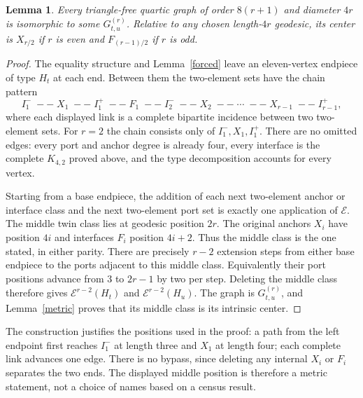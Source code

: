 \documentclass[11pt]{article}
\newtheorem{lemma}[theorem]{Lemma}
\theoremstyle{definition}\newtheorem{definition}[theorem]{Definition}
\newcommand{\E}{\mathcal E}
\begin{document}
\begin{lemma}\label{complete}
Every triangle-free quartic graph of order $8(r+1)$ and diameter
$4r$ is isomorphic to some $G_{t,u}^{(r)}$. Relative to any chosen
length-$4r$ geodesic, its center is $X_{r/2}$ if $r$ is even and
$F_{(r-1)/2}$ if $r$ is odd.
\end{lemma}
\begin{proof}
The equality structure and Lemma~\ref{forced} leave an eleven-vertex
endpiece of type $H_t$ at each end. Between them the two-element
sets have the chain pattern
\[
 I_1^-\;--\;X_1\;--\;I_1^+\;--\;F_1\;--\;
 I_2^-\;--\;X_2\;--\;\cdots\;--\;X_{r-1}\;--\;I_{r-1}^+,
\]
where each displayed link is a complete bipartite incidence between
two two-element sets. For $r=2$ the chain consists only of
$I_1^-,X_1,I_1^+$. There are no omitted edges: every port and
anchor degree is already four, every interface is the complete
$K_{4,2}$ proved above, and the type decomposition accounts for
every vertex.

Starting from a base endpiece, the addition of each next two-element
anchor or interface class and the next two-element port set is
exactly one application of $\E$. The middle twin class lies at
geodesic position $2r$. The original anchors $X_i$ have position
$4i$ and interfaces $F_i$ position $4i+2$. Thus the middle class
is the one stated, in either parity. There are precisely $r-2$
extension steps from either base endpiece to the ports adjacent
to this middle class. Equivalently their port positions advance
from $3$ to $2r-1$ by two per step. Deleting the middle class
therefore gives $\E^{r-2}(H_t)$ and $\E^{r-2}(H_u)$.
The graph is $G_{t,u}^{(r)}$, and Lemma~\ref{metric} proves that
its middle class is its intrinsic center.
\end{proof}

The construction justifies the positions used in the proof: a path
from the left endpoint first reaches $I_1^-$ at length three and
$X_1$ at length four; each complete link advances one edge. There
is no bypass, since deleting any internal $X_i$ or $F_i$ separates
the two ends. The displayed middle position is therefore a metric
statement, not a choice of names based on a census result.
\end{document}
